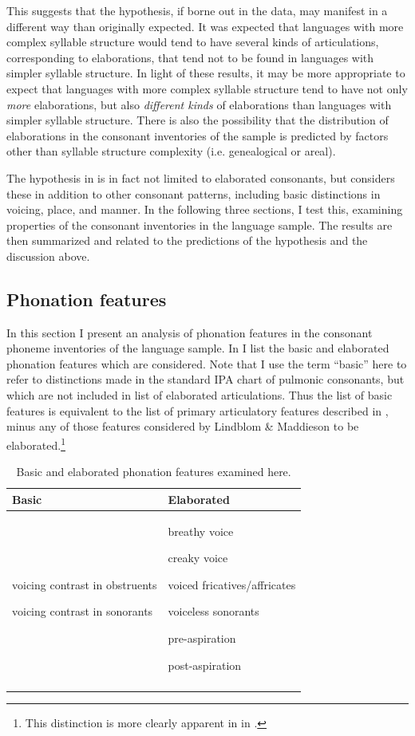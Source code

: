   This suggests that the hypothesis, if borne out in the data, may manifest in a different way than originally expected. It was expected that languages with more complex syllable structure would tend to have several kinds of articulations, corresponding to elaborations, that tend not to be found in languages with simpler syllable structure. In light of these results, it may be more appropriate to expect that languages with more complex syllable structure tend to have not only \textit{more} elaborations, but also \textit{different kinds} of elaborations than languages with simpler syllable structure. There is also the possibility that the distribution of elaborations in the consonant inventories of the sample is predicted by factors other than syllable structure complexity (i.e. genealogical or areal).

  The hypothesis in  is in fact not limited to elaborated consonants, but considers these in addition to other consonant patterns, including basic distinctions in voicing, place, and manner. In the following three sections, I test this, examining properties of the consonant inventories in the language sample. The results are then summarized and related to the predictions of the hypothesis and the discussion above.

\subsection{Phonation features}\label{sec:4.4.3}

  In this section I present an analysis of phonation features in the consonant phoneme inventories of the language sample. In  I list the basic and elaborated phonation features which are considered. Note that I use the term ``basic'' here to refer to distinctions made in the standard IPA chart of pulmonic consonants, but which are not included in    list of elaborated articulations. Thus the list of basic features is equivalent to the list of primary articulatory features described in , minus any of those features considered by Lindblom \& Maddieson to be elaborated.\footnote{{This distinction is more clearly apparent in  in .}}

\begin{table}
\begin{tabularx}{\textwidth}{QQ}
\lsptoprule
Basic & Elaborated\\\midrule
voicing contrast in obstruents

voicing contrast in sonorants & breathy voice

creaky voice

voiced fricatives/affricates

voiceless sonorants

pre-aspiration

post-aspiration\\
\lspbottomrule
\end{tabularx}
\caption{\label{tab:4.12}Basic and elaborated phonation features examined here.}
\end{table}

